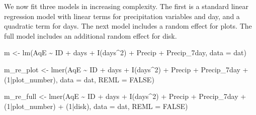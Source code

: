 \documentclass[
  ignorenonframetext,
]{beamer}
\newenvironment{Shaded}{\begin{snugshade}}{\end{snugshade}}
\newcommand{\AttributeTok}[1]{\textcolor[rgb]{0.77,0.63,0.00}{#1}}
\newcommand{\ConstantTok}[1]{\textcolor[rgb]{0.00,0.00,0.00}{#1}}
\newcommand{\DecValTok}[1]{\textcolor[rgb]{0.00,0.00,0.81}{#1}}
\newcommand{\FunctionTok}[1]{\textcolor[rgb]{0.00,0.00,0.00}{#1}}
\newcommand{\NormalTok}[1]{#1}
\newcommand{\OtherTok}[1]{\textcolor[rgb]{0.56,0.35,0.01}{#1}}
\newcommand{\SpecialCharTok}[1]{\textcolor[rgb]{0.00,0.00,0.00}{#1}}
\begin{document}
\begin{frame}[fragile]{}
\protect\hypertarget{section-15}{}
We now fit three models in increasing complexity. The first is a
standard linear regression model with linear terms for precipitation
variables and day, and a quadratic term for days. The next model
includes a random effect for plots. The full model includes an
additional random effect for disk.

\vspace{12pt}
\tiny

\begin{Shaded}
\begin{Highlighting}[]
\NormalTok{m }\OtherTok{\textless{}{-}} \FunctionTok{lm}\NormalTok{(AqE }\SpecialCharTok{\textasciitilde{}}\NormalTok{ ID }\SpecialCharTok{+}\NormalTok{ days }\SpecialCharTok{+} \FunctionTok{I}\NormalTok{(days}\SpecialCharTok{\^{}}\DecValTok{2}\NormalTok{) }\SpecialCharTok{+}\NormalTok{ Precip }\SpecialCharTok{+}\NormalTok{ Precip\_7day, }
  \AttributeTok{data =}\NormalTok{ dat)}

\NormalTok{m\_re\_plot }\OtherTok{\textless{}{-}} \FunctionTok{lmer}\NormalTok{(AqE }\SpecialCharTok{\textasciitilde{}}\NormalTok{ ID }\SpecialCharTok{+}\NormalTok{ days }\SpecialCharTok{+} \FunctionTok{I}\NormalTok{(days}\SpecialCharTok{\^{}}\DecValTok{2}\NormalTok{) }\SpecialCharTok{+}\NormalTok{ Precip }\SpecialCharTok{+} 
\NormalTok{  Precip\_7day }\SpecialCharTok{+}\NormalTok{ (}\DecValTok{1}\SpecialCharTok{|}\NormalTok{plot\_number), }\AttributeTok{data =}\NormalTok{ dat, }\AttributeTok{REML =} \ConstantTok{FALSE}\NormalTok{)}

\NormalTok{m\_re\_full }\OtherTok{\textless{}{-}} \FunctionTok{lmer}\NormalTok{(AqE }\SpecialCharTok{\textasciitilde{}}\NormalTok{ ID }\SpecialCharTok{+}\NormalTok{ days }\SpecialCharTok{+} \FunctionTok{I}\NormalTok{(days}\SpecialCharTok{\^{}}\DecValTok{2}\NormalTok{) }\SpecialCharTok{+}\NormalTok{ Precip }\SpecialCharTok{+} 
\NormalTok{  Precip\_7day }\SpecialCharTok{+}\NormalTok{ (}\DecValTok{1}\SpecialCharTok{|}\NormalTok{plot\_number) }\SpecialCharTok{+}\NormalTok{ (}\DecValTok{1}\SpecialCharTok{|}\NormalTok{disk), }\AttributeTok{data =}\NormalTok{ dat, }\AttributeTok{REML =} \ConstantTok{FALSE}\NormalTok{)}
\end{Highlighting}
\end{Shaded}
\end{frame}
\end{document}
